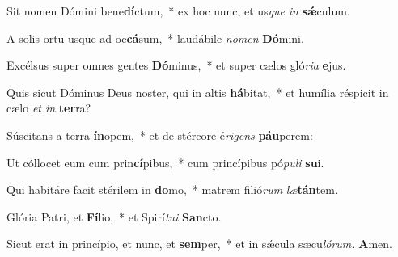 \item Sit nomen Dómini bene\textbf{dí}ctum,~* ex hoc nunc, et us\hspace{0.03em}\textit{que} \textit{in} \textbf{sǽ}culum.
\item A solis ortu usque ad oc\textbf{cá}sum,~* laudábile \textit{nomen} \textbf{Dó}mini.
\item Excélsus super omnes gentes \textbf{Dó}minus,~* et super cælos gló\textit{ria} \textbf{e}jus.
\item Quis sicut Dóminus Deus noster, qui in altis \textbf{há}bitat,~* et humília réspicit in cælo \textit{et in} \textbf{ter}ra?
\item Súscitans a terra \textbf{ín}opem,~* et de stércore é\hspace{0.03em}\textit{rigens} \textbf{páu}perem:
\item Ut cóllocet eum cum prin\textbf{cí}pibus,~* cum princípibus pó\textit{puli} \textbf{su}i.
\item Qui habitáre facit stérilem in \textbf{do}mo,~* matrem filió\textit{rum} \textit{læ}\textbf{tán}tem.
\item Glória Patri, et \textbf{Fí}lio,~* et Spirí\hspace{0.03em}\textit{tui} \textbf{San}cto.
\item Sicut erat in princípio, et nunc, et \textbf{sem}per,~* et in sǽcula sæcu\hspace{0.03em}\textit{lórum.} \textbf{A}men.
